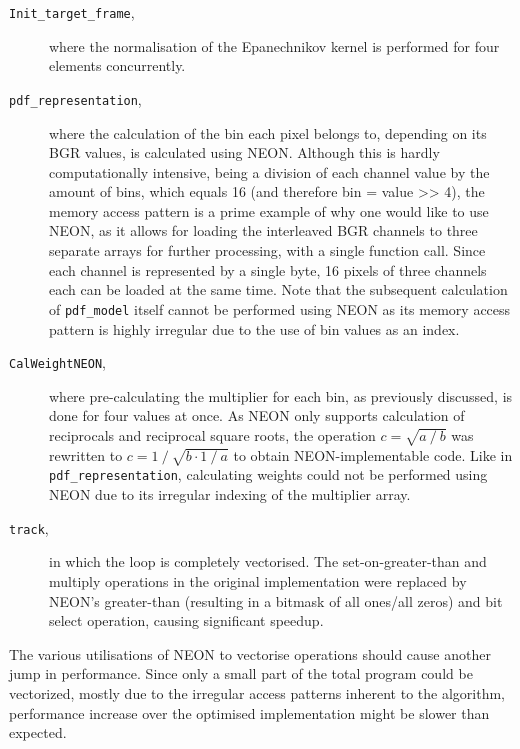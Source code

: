 \documentclass[final]{article}
\begin{document}
\begin{description}
    \item[\texttt{Init\_target\_frame},] where the normalisation of the Epanechnikov kernel is performed for four elements concurrently.

    \item[\texttt{pdf\_representation},] where the calculation of the bin each pixel belongs to, depending on its BGR values, is calculated using NEON.
    Although this is hardly computationally intensive, being a division of each channel value by the amount of bins, which equals 16 (and therefore bin = value >> 4), the memory access pattern is a prime example of why one would like to use NEON, as it allows for loading the interleaved BGR channels to three separate arrays for further processing, with a single function call.
    Since each channel is represented by a single byte, 16 pixels of three channels each can be loaded at the same time.
    Note that the subsequent calculation of \texttt{pdf\_model} itself cannot be performed using NEON as its memory access pattern is highly irregular due to the use of bin values as an index.

    \item[\texttt{CalWeightNEON},] where pre-calculating the multiplier for each bin, as previously discussed, is done for four values at once.
    As NEON only supports calculation of reciprocals and reciprocal square roots, the operation $c = \sqrt{a \mathbin{/} b}$ was rewritten to $c = 1 \mathbin{/} \sqrt{b \cdot 1 \mathbin{/} a}$ to obtain NEON-implementable code.
    Like in \texttt{pdf\_representation}, calculating weights could not be performed using NEON due to its irregular indexing of the multiplier array.

    \item[\texttt{track},] in which the loop is completely vectorised.
    The set-on-greater-than and multiply operations in the original implementation were replaced by NEON's greater-than (resulting in a bitmask of all ones/all zeros) and bit select operation, causing significant speedup.
\end{description}

The various utilisations of NEON to vectorise operations should cause another jump in performance. Since only a small part of the total program could be vectorized, mostly due to the irregular access patterns inherent to the algorithm, performance increase over the optimised implementation might be slower than expected.
\end{document}
